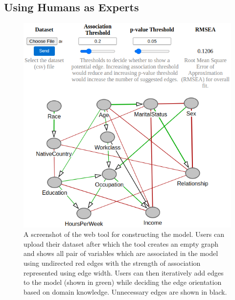\documentclass[accepted]{uai2025} %
\begin{document}
\subsection{Using Humans as Experts}


\begin{figure}[t!]
	\centering
	\includegraphics[scale=0.4]{../code/plots/web_tool_full_new.png}
	\caption{A screenshot of the web tool for constructing the model. Users
		can upload their dataset after which the tool creates an empty
		graph and shows all pair of variables which are associated in
		the model using undirected red edges with the strength of
		association represented using edge width. Users can then
		iteratively add edges to the model (shown in green) while
		deciding the edge orientation based on domain knowledge.
		Unnecessary edges are shown in black.}
	\label{fig:web}
\end{figure}
\end{document}

